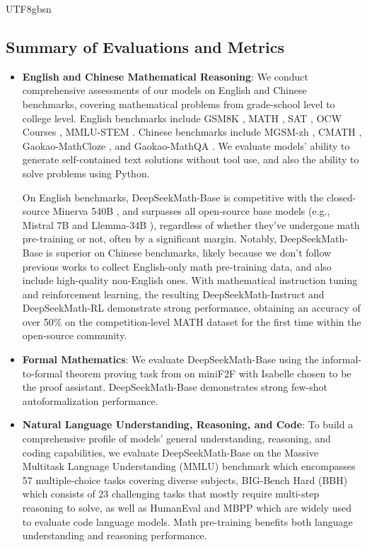 \documentclass[11pt, a4paper, logo, copyright, nonumbering]{deepseek}
\newcommand{\spmath}{DeepSeekMath}
\begin{document}
\begin{CJK*}{UTF8}{gbsn}
\subsection{Summary of Evaluations and Metrics}
\begin{itemize}[topsep=0pt]
    \item \textbf{English and Chinese Mathematical Reasoning}:
    We conduct comprehensive assessments of our models on English and Chinese benchmarks, covering mathematical problems from grade-school level to college level.
    English benchmarks include GSM8K \citep{gsm8k}, MATH \citep{MATH}, SAT \citep{llemma}, OCW Courses \citep{minerva}, MMLU-STEM \citep{mmlu}.
    Chinese benchmarks include MGSM-zh \citep{mgsm}, CMATH \citep{wei2023cmath}, Gaokao-MathCloze \citep{agieval}, and Gaokao-MathQA \citep{agieval}.
    We evaluate models' ability to generate self-contained text solutions without tool use, and also the ability to solve problems using Python.
    
    On English benchmarks, \spmath-Base is competitive with the closed-source Minerva 540B \citep{minerva}, and surpasses all open-source base models (e.g., Mistral 7B \citep{mistral} and Llemma-34B \citep{llemma}), regardless of whether they've undergone math pre-training or not, often by a significant margin.
    Notably, \spmath-Base is superior on Chinese benchmarks, likely because we don't follow previous works \citep{minerva,llemma} to collect English-only math pre-training data, and also include high-quality non-English ones.
    With mathematical instruction tuning and reinforcement learning, the resulting \spmath-Instruct and \spmath-RL demonstrate strong performance, obtaining an accuracy of over 50\% on the competition-level MATH dataset for the first time within the open-source community.
    \item \textbf{Formal Mathematics}:
    We evaluate \spmath-Base using the informal-to-formal theorem proving task from \citep{dsp_proof} on miniF2F \citep{minif2f} with Isabelle \citep{isabelle} chosen to be the proof assistant.
    \spmath-Base demonstrates strong few-shot autoformalization performance.
    \item \textbf{Natural Language Understanding, Reasoning, and Code}:
    To build a comprehensive profile of models' general understanding, reasoning, and coding capabilities, we evaluate \spmath-Base on the Massive Multitask Language Understanding (MMLU) benchmark \citep{mmlu} which encompasses 57 multiple-choice tasks covering diverse subjects, BIG-Bench Hard (BBH) \citep{bbh} which consists of 23 challenging tasks that mostly require multi-step reasoning to solve, as well as HumanEval \citep{codex} and MBPP \citep{mbpp} which are widely used to evaluate code language models.
    Math pre-training benefits both language understanding and reasoning performance.
\end{itemize}


\end{CJK*}
\end{document}
